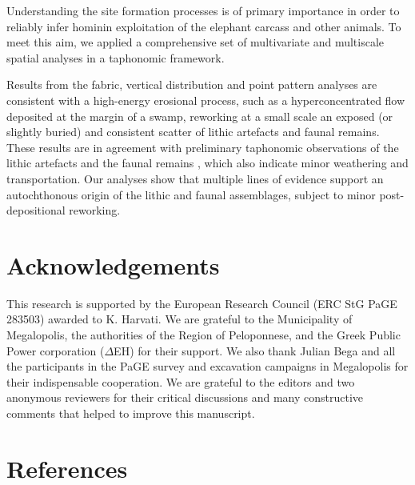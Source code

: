 \documentclass[preprint,authoryear,times]{elsarticle} %
\begin{document}
Understanding the site formation processes is of primary importance in order to reliably infer hominin exploitation of the elephant carcass and other animals. To meet this aim, we applied a comprehensive set of multivariate and multiscale spatial analyses in a taphonomic framework.

Results from the fabric, vertical distribution and point pattern analyses are consistent with a high-energy erosional process, such as a hyperconcentrated flow deposited at the margin of a swamp, reworking at a small scale an exposed (or slightly buried) and consistent scatter of lithic artefacts and faunal remains. These results are in agreement with preliminary taphonomic observations of the lithic artefacts \citep{Tourloukis} and the faunal remains \citep{Konidaris}, which also indicate minor weathering and transportation. Our analyses show that multiple lines of evidence support an autochthonous origin of the lithic and faunal assemblages, subject to minor post-depositional reworking.

\section*{Acknowledgements}

This research is supported by the European Research Council (ERC StG PaGE 283503) awarded to K. Harvati. We are grateful to the Municipality of Megalopolis, the authorities of the Region of Peloponnese, and the Greek Public Power corporation ($\Delta$EH) for their support. We also thank Julian Bega and all the participants in the PaGE survey and excavation campaigns in Megalopolis for their indispensable cooperation. We are grateful to the editors and two anonymous reviewers for their critical discussions and many constructive comments that helped to improve this manuscript.
 
\section*{References}



\end{document}
